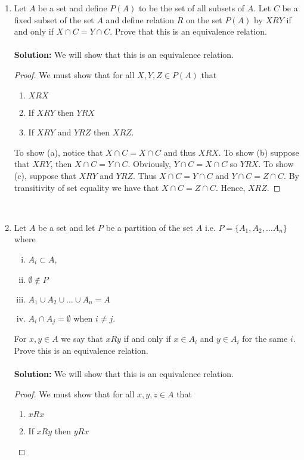 \documentclass[12pt,letterpaper]{article}
\theoremstyle{plain}
\theoremstyle{definition}
\begin{document}
\begin{enumerate}[1.]
\item Let $A$ be a set and define $P(A)$ to be the set of all subsets of $A$. Let $C$ be a fixed subset of the set $A$ and define relation $R$ on the set $P(A)$ by $X R Y$ if and only if $X\cap C=Y\cap C$. Prove that this is an equivalence relation.\\
\ \\
{\bf Solution: }
We will show that this is an equivalence relation.\\ 
\begin{proof} We must show that for all $X, Y, Z\in P(A)$ that 
\begin{enumerate}
\item\label{a} $X R X$ 
\item\label{b} If $X R Y$ then $Y R X$
\item\label{c} If $X R Y$ and $Y R Z$ then $X R Z$.
\end{enumerate}
To show (a), notice that $X\cap C=X\cap C$ and thus $XRX$.  To show (b) suppose that $X R Y$, then $X\cap C=Y\cap C$. Obviously, $Y\cap C=X\cap C$ so $Y R X$. To show (c), suppose that $ X R Y$ and $Y R Z$. Thus $X\cap C=Y\cap C$ and $Y\cap C=Z\cap C$. By transitivity of set equality we have that $X\cap C= Z\cap C$. Hence, $XRZ$. 
\end{proof}
\ \\
\item Let $A$ be a set and let $P$ be a partition of the set $A$ i.e. $P=\{A_1, A_2, \ldots A_n\}$ where 
\begin{enumerate}[i)]
\item $A_i\subset A$, 
\item $\emptyset \not \in P$
\item $A_1\cup A_2\cup \ldots \cup A_n=A$ 
\item $A_i\cap A_j =\emptyset $ when $i\neq j$. 
\end{enumerate}
For $x,y \in A$ we say that $x R y$ if and only if $x\in A_i$ and $y\in A_i$ for the same $i$. Prove this is an equivalence relation. \\
\ \\
{\bf Solution: }
We will show that this is an equivalence relation.\\ 
\begin{proof} We must show that for all $x, y, z\in A$ that 
\begin{enumerate}
\item\label{a} $x R x$ 
\item\label{b} If $x R y$ then $y R x$

\end{enumerate}
\end{proof}
\end{enumerate}
\end{document}
